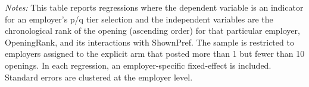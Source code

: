 
\begin{table}[!htbp] \centering 
\centering
\begin{minipage}{1\linewidth} 
 \emph{Notes:} This table reports regressions where the dependent variable is an indicator for an employer's p/q tier selection and the independent variables are the chronological rank of the opening (ascending order) for that particular employer, OpeningRank, and its interactions with ShownPref.
\shownprefdef
The sample is restricted to employers assigned to the explicit arm that posted more than 1 but fewer than 10 openings.
\explicitdef
In each regression, an employer-specific fixed-effect is included. 
Standard errors are clustered at the employer level. 
 \starlanguage
 \end{minipage}
\end{table}
